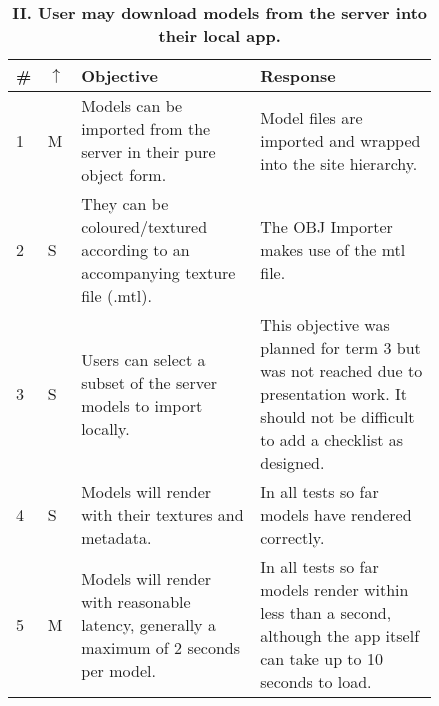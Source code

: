 \documentclass[12pt, a4paper]{article}
\newcommand{\done}[1]{\textcolor{brycedoesntlikegrey}{#1}}
\begin{document}
\begin{table}[H]
\caption{\textbf{II. User may download models from the server into their local app.}}
\begin{tabular}{| p{0.02\linewidth} | p{0.02\linewidth} | p{0.4\linewidth} | p{0.4\linewidth} | }
\hline
\textbf{\#} & \textbf{$\uparrow$} & \textbf{Objective} & \textbf{Response}
\\
\hline
1 & M & \done{Models can be imported from the server in their pure object form. } & Model files are imported and wrapped into the site hierarchy. \\ \hline
2 & S & \done{They can be coloured/textured according to an accompanying texture file (.mtl).} & The OBJ Importer makes use of the mtl file. \\ \hline
3 & S &  Users can select a subset of the server models to import locally. & This objective was planned for term 3 but was not reached due to presentation work. It should not be difficult to add a checklist as designed. \\ \hline
4 & S & \done{Models will render with their textures and metadata.} & In all tests so far models have rendered correctly. \\ \hline
5 & M & \done{Models will render with reasonable latency, generally a maximum of 2 seconds per model.} & In all tests so far models render within less than a second, although the app itself can take up to 10 seconds to load. \\ \hline
\end{tabular}
\label{table:obj2}
\end{table}
\end{document}
